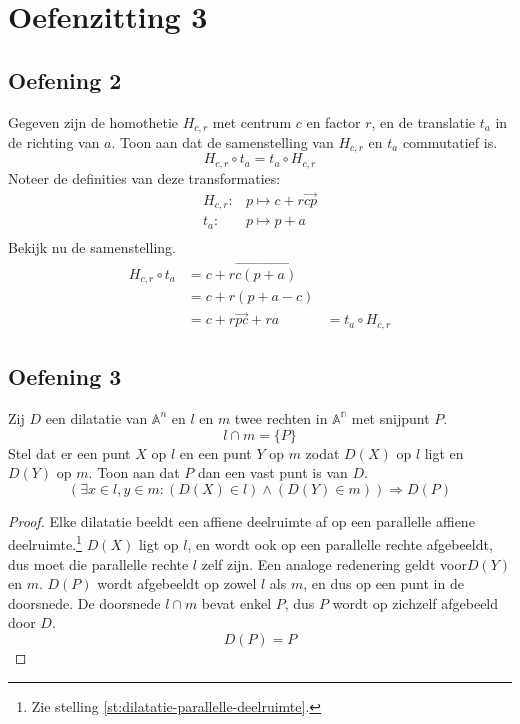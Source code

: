\documentclass[main.tex]{subfiles}
\begin{document}

\section{Oefenzitting 3}

\subsection*{Oefening 2}
Gegeven zijn de homothetie $H_{c,r}$ met centrum $c$ en factor $r$, en de translatie $t_{a}$ in de richting van $a$.
Toon aan dat de samenstelling van $H_{c,r}$ en $t_{a}$ commutatief is.
\[ H_{c,r} \circ t_{a} = t_{a} \circ H_{c,r} \]
Noteer de definities van deze transformaties:
\[ 
\begin{array}{rl}
  H_{c,r}: & p \mapsto c + r\overrightarrow{cp}\\
  t_{a}:   & p \mapsto p + a\\
\end{array}
\]
Bekijk nu de samenstelling.
\[ 
\begin{array}{rll}
  H_{c,r} \circ t_{a} &= c + r\overrightarrow{c(p+a)} &\\
                     &= c + r(p + a - c) &\\
                     &= c + r\overrightarrow{pc} +ra &= t_{a} \circ H_{c,r}
\end{array}
\]

\subsection*{Oefening 3}
Zij $D$ een dilatatie van $\mathbb{A}^{n}$ en $l$ en $m$ twee rechten in $\mathbb{A^{n}}$ met snijpunt $P$.
\[ l \cap m = \{P\}\]
Stel dat er een punt $X$ op $l$ en een punt $Y$ op $m$ zodat $D(X)$ op $l$ ligt en $D(Y)$ op $m$.
Toon aan dat $P$ dan een vast punt is van $D$.
\[ (\exists x\in l,y\in m: (D(X) \in l) \wedge (D(Y) \in m)) \Rightarrow D(P) \]
\begin{proof}
  Elke dilatatie beeldt een affiene deelruimte af op een parallelle affiene deelruimte.\footnote{Zie stelling \ref{st:dilatatie-parallelle-deelruimte}.}
  $D(X)$ ligt op $l$, en wordt ook op een parallelle rechte afgebeeldt, dus moet die parallelle rechte $l$ zelf zijn.
  Een analoge redenering geldt voor$D(Y)$ en $m$.
  $D(P)$ wordt afgebeeldt op zowel $l$ als $m$, en dus op een punt in de doorsnede.
  De doorsnede $l\cap m$ bevat enkel $P$, dus $P$ wordt op zichzelf afgebeeld door $D$.
  \[ D(P) = P \]
\end{proof}
\end{document}
